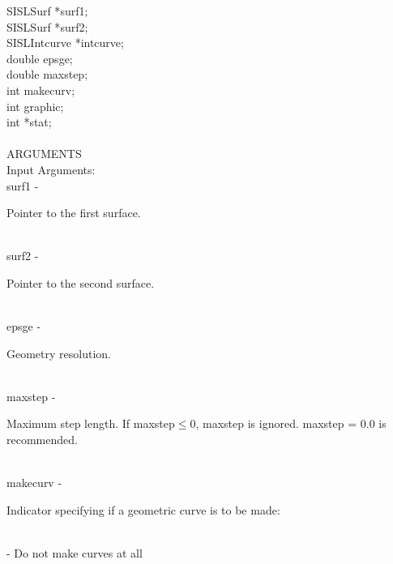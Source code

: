                 \>\>    SISLSurf        \>      *{\fov surf1};\\
                \>\>    SISLSurf        \>      *{\fov surf2};\\
                \>\>    SISLIntcurve\>  *{\fov intcurve};\\
                \>\>    double  \>      {\fov epsge};\\
                \>\>    double  \>      {\fov maxstep};\\
                \>\>    int     \>      {\fov makecurv};\\
                \>\>    int     \>      {\fov graphic};\\
                \>\>    int     \>      *{\fov stat};\\
\\
ARGUMENTS\\
        \>Input Arguments:\\
        \>\>    {\fov surf1}\> - \>     \begin{minipg2}
                                Pointer to the first surface.
                                \end{minipg2}\\
        \>\>    {\fov surf2}\> - \>     \begin{minipg2}
                                Pointer to the second surface.
                                \end{minipg2}\\
        \>\>    {\fov epsge}\> - \>     \begin{minipg2}
                                Geometry resolution.
                                \end{minipg2} \\
        \>\>    {\fov maxstep}\> - \>   \begin{minipg2}
                                Maximum step length. If maxstep$\leq$0, maxstep is ignored.
                                maxstep = 0.0 is recommended.
                                \end{minipg2}\\[0.8ex]
        \>\>    {\fov makecurv}\> - \>  \begin{minipg2}
                                Indicator specifying if a geometric curve is to be made:
                                \end{minipg2}\\
                \>\>\>\> -     \>Do not make curves at all\\
